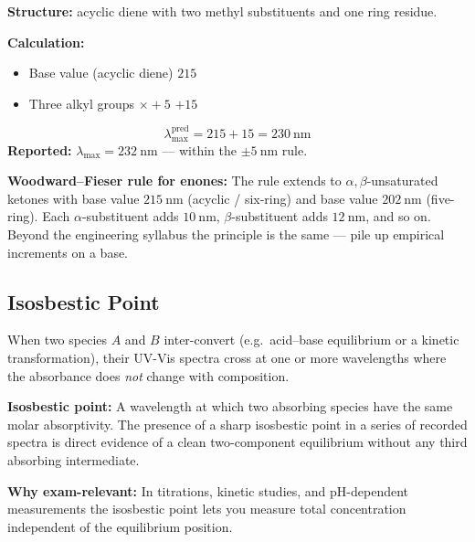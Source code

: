 \documentclass[12pt,a4paper]{article}
\begin{document}
\begin{tcolorbox}[examplebox, title={Solved Example: Predicting \texorpdfstring{$\lambda_{\max}$}{lambda max} of 2,4-Dimethyl-1,3-pentadiene}]
\textbf{Structure:} acyclic diene with two methyl substituents and one ring residue.

\textbf{Calculation:}
\begin{itemize}[leftmargin=*, itemsep=1pt, topsep=2pt]
  \item Base value (acyclic diene) \dotfill $215$
  \item Three alkyl groups $\times +5$ \dotfill $+15$
\end{itemize}
\[
\lambda_{\max}^{\text{pred}} = 215 + 15 = 230\ \mathrm{nm}
\]
\textbf{Reported:} $\lambda_{\max}=232\ \mathrm{nm}$ — within the $\pm 5\ \mathrm{nm}$ rule.
\end{tcolorbox}

\textbf{Woodward--Fieser rule for enones:} The rule extends to $\alpha,\beta$-unsaturated ketones with base value $215\ \mathrm{nm}$ (acyclic / six-ring) and base value $202\ \mathrm{nm}$ (five-ring). Each $\alpha$-substituent adds $10\ \mathrm{nm}$, $\beta$-substituent adds $12\ \mathrm{nm}$, and so on. Beyond the engineering syllabus the principle is the same — pile up empirical increments on a base.

\subsection{Isosbestic Point}
When two species $A$ and $B$ inter-convert (e.g.\ acid--base equilibrium or a kinetic transformation), their UV-Vis spectra cross at one or more wavelengths where the absorbance does \emph{not} change with composition.

\begin{tcolorbox}[defbox]
\textbf{Isosbestic point:} A wavelength at which two absorbing species have the same molar absorptivity. The presence of a sharp isosbestic point in a series of recorded spectra is direct evidence of a clean two-component equilibrium without any third absorbing intermediate.
\end{tcolorbox}

\textbf{Why exam-relevant:} In titrations, kinetic studies, and pH-dependent measurements the isosbestic point lets you measure total concentration independent of the equilibrium position.
\end{document}
